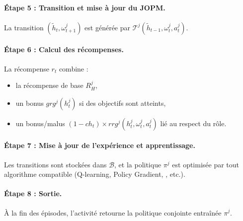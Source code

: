 \paragraph{Étape 5 : Transition et mise à jour du JOPM.}
La transition $(\tilde{h}_t,\omega_{t+1}^j)$ est générée par $\mathcal{T}^j(\tilde{h}_{t-1},\omega_t^j,a_t^j)$.

\paragraph{Étape 6 : Calcul des récompenses.}
La récompense $r_t$ combine :
\begin{itemize}
    \item la récompense de base $R^j_H$,
    \item un bonus $grg^j(h^j_t)$ si des objectifs sont atteints,
    \item un bonus/malus $(1-ch_t)\times rrg^j(h^j_t,\omega_t^j,a_t^j)$ lié au respect du rôle.
\end{itemize}

\paragraph{Étape 7 : Mise à jour de l’expérience et apprentissage.}
Les transitions sont stockées dans $\mathcal{B}$, et la politique $\pi^j$ est optimisée par tout algorithme  compatible (Q-learning, Policy Gradient, , etc.).

\paragraph{Étape 8 : Sortie.}
À la fin des épisodes, l’activité retourne la politique conjointe entraînée $\pi^j$.


